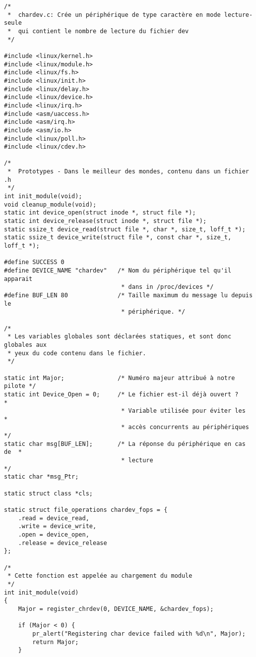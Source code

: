 \documentclass[11pt]{article}
\begin{document}
\begin{verbatim}
/*
 *  chardev.c: Crée un périphérique de type caractère en mode lecture-seule
 *  qui contient le nombre de lecture du fichier dev
 */

#include <linux/kernel.h>
#include <linux/module.h>
#include <linux/fs.h>
#include <linux/init.h>
#include <linux/delay.h>
#include <linux/device.h>
#include <linux/irq.h>
#include <asm/uaccess.h>
#include <asm/irq.h>
#include <asm/io.h>
#include <linux/poll.h>
#include <linux/cdev.h>

/*
 *  Prototypes - Dans le meilleur des mondes, contenu dans un fichier .h
 */
int init_module(void);
void cleanup_module(void);
static int device_open(struct inode *, struct file *);
static int device_release(struct inode *, struct file *);
static ssize_t device_read(struct file *, char *, size_t, loff_t *);
static ssize_t device_write(struct file *, const char *, size_t, loff_t *);

#define SUCCESS 0
#define DEVICE_NAME "chardev"   /* Nom du périphérique tel qu'il apparait
                                 * dans in /proc/devices */
#define BUF_LEN 80              /* Taille maximum du message lu depuis le
                                 * périphérique. */

/*
 * Les variables globales sont déclarées statiques, et sont donc globales aux
 * yeux du code contenu dans le fichier.
 */

static int Major;               /* Numéro majeur attribué à notre pilote */
static int Device_Open = 0;     /* Le fichier est-il déjà ouvert ?       *
                                 * Variable utilisée pour éviter les     *
                                 * accès concurrents au périphériques    */
static char msg[BUF_LEN];       /* La réponse du périphérique en cas de  *
                                 * lecture                               */
static char *msg_Ptr;

static struct class *cls;

static struct file_operations chardev_fops = {
    .read = device_read,
    .write = device_write,
    .open = device_open,
    .release = device_release
};

/*
 * Cette fonction est appelée au chargement du module
 */
int init_module(void)
{
    Major = register_chrdev(0, DEVICE_NAME, &chardev_fops);

    if (Major < 0) {
        pr_alert("Registering char device failed with %d\n", Major);
        return Major;
    }


\end{verbatim}
\end{document}

